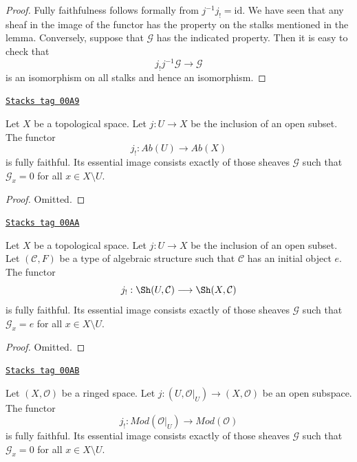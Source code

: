 \begin{proof}
Fully faithfulness follows formally from $j^{-1} j_! = \text{id}$.
We have seen that any sheaf in the image of the functor has
the property on the stalks mentioned in the lemma. Conversely, suppose
that $\mathcal{G}$ has the indicated property.
Then it is easy to check that
$$
j_! j^{-1} \mathcal{G} \to \mathcal{G}
$$
is an isomorphism on all stalks and hence an isomorphism.
\end{proof}

\begin{lemma}
\label{sheaves-lemma-equivalence-categories-open-abelian}
\href{https://stacks.math.columbia.edu/tag/00A9}{\texttt{Stacks tag 00A9}}

Let $X$ be a topological space.
Let $j : U \to X$ be the inclusion of an open subset.
The functor
$$
j_! : \textit{Ab}(U) \longrightarrow \textit{Ab}(X)
$$
is fully faithful. Its essential image consists exactly
of those sheaves $\mathcal{G}$ such that
$\mathcal{G}_x = 0$ for all $x \in X \setminus U$.
\end{lemma}

\begin{proof}
Omitted.
\end{proof}

\begin{lemma}
\label{sheaves-lemma-equivalence-categories-open-structures}
\href{https://stacks.math.columbia.edu/tag/00AA}{\texttt{Stacks tag 00AA}}

Let $X$ be a topological space.
Let $j : U \to X$ be the inclusion of an open subset.
Let $(\mathcal{C}, F)$ be a type of algebraic structure
such that $\mathcal{C}$ has an initial object $e$.
The functor
$$
j_! : \Sh(U, \mathcal{C}) \longrightarrow \Sh(X, \mathcal{C})
$$
is fully faithful. Its essential image consists exactly
of those sheaves $\mathcal{G}$ such that
$\mathcal{G}_x = e$ for all $x \in X \setminus U$.
\end{lemma}

\begin{proof}
Omitted.
\end{proof}


\begin{lemma}
\label{sheaves-lemma-equivalence-categories-open-modules}
\href{https://stacks.math.columbia.edu/tag/00AB}{\texttt{Stacks tag 00AB}}

Let $(X, \mathcal{O})$ be a ringed space.
Let $j : (U, \mathcal{O}|_U) \to (X, \mathcal{O})$
be an open subspace.
The functor
$$
j_! : \textit{Mod}(\mathcal{O}|_U) \longrightarrow \textit{Mod}(\mathcal{O})
$$
is fully faithful. Its essential image consists exactly
of those sheaves $\mathcal{G}$ such that
$\mathcal{G}_x = 0$ for all $x \in X \setminus U$.
\end{lemma}


